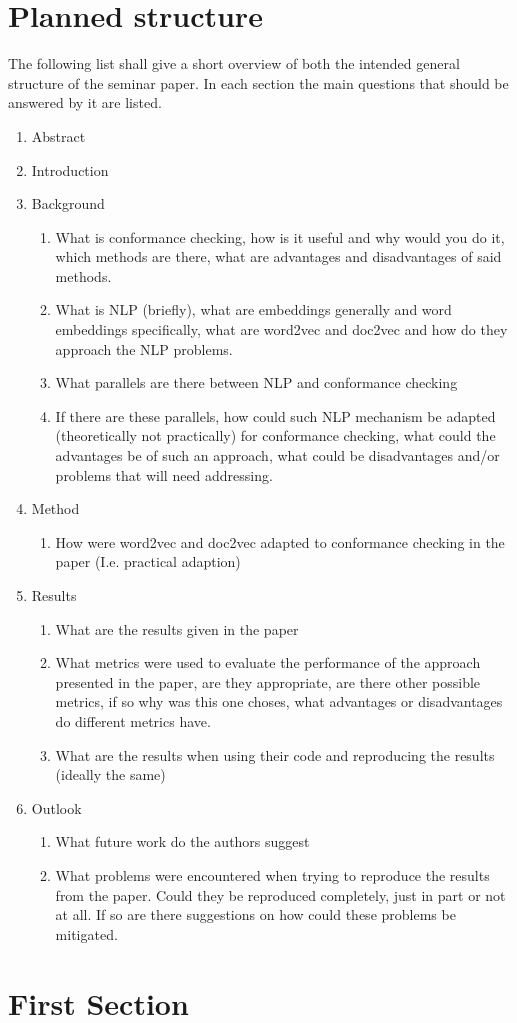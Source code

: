\documentclass[runningheads]{template/llncs}
\begin{document}
\section{Planned structure}
The following list shall give a short overview of both the intended general structure of the seminar paper. In each section the main questions that should be answered by it are listed.
\begin{enumerate}
	\item Abstract
	\item Introduction
	\item Background
	\begin{enumerate}
		\item What is conformance checking, how is it useful and why would you do it, which methods are there, what are advantages and disadvantages of said methods.
		\item What is NLP (briefly), what are embeddings generally and word embeddings specifically, what are word2vec and doc2vec and how do they approach the NLP problems.
		\item What parallels are there between NLP and conformance checking
		\item If there are these parallels, how could such NLP mechanism be adapted (theoretically not practically) for conformance checking, what could the advantages be of such an approach, what could be disadvantages and/or problems that will need addressing.
	\end{enumerate}
	\item Method
	\begin{enumerate}
		\item How were word2vec and doc2vec adapted to conformance checking in the paper (I.e. practical adaption)
	\end{enumerate}
	\item Results
	\begin{enumerate}
		\item What are the results given in the paper
		\item What metrics were used to evaluate the performance of the approach presented in the paper, are they appropriate, are there other possible metrics, if so why was this one choses, what advantages or disadvantages do different metrics have.
		\item What are the results when using their code and reproducing the results (ideally the same)
	\end{enumerate}
	\item Outlook
	\begin{enumerate}
		\item What future work do the authors suggest
		\item What problems were encountered when trying to reproduce the results from the paper. Could they be reproduced completely, just in part or not at all. If so are there suggestions on how could these problems be mitigated.
	\end{enumerate}
\end{enumerate}

\section{First Section}

%
%
%


%
\end{document}
